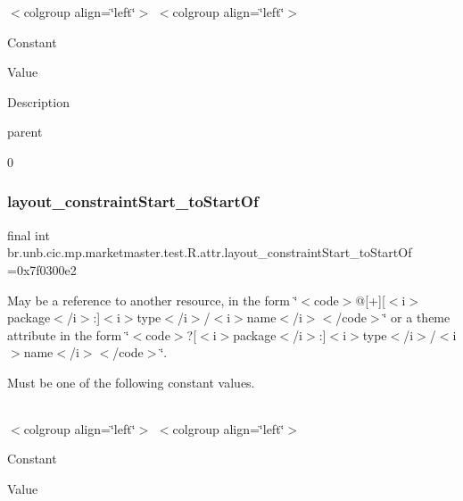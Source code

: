 \tabulinesep=1mm
\begin{longtabu} spread 0pt [c]{*{0}{|X[-1]}|}
\hline
\end{longtabu}
$<$colgroup align=\char`\"{}left\char`\"{}$>$ $<$colgroup align=\char`\"{}left\char`\"{}$>$ 

Constant

Value

Description 

parent

0\mbox{\label{classbr_1_1unb_1_1cic_1_1mp_1_1marketmaster_1_1test_1_1R_1_1attr_a4297387be435a53dc50588895bb90ec6}} 
\subsubsection{\texorpdfstring{layout\+\_\+constraint\+Start\+\_\+to\+Start\+Of}{layout\_constraintStart\_toStartOf}}
{\footnotesize\ttfamily final int br.\+unb.\+cic.\+mp.\+marketmaster.\+test.\+R.\+attr.\+layout\+\_\+constraint\+Start\+\_\+to\+Start\+Of =0x7f0300e2\hspace{0.3cm}{\ttfamily [static]}}

May be a reference to another resource, in the form \char`\"{}$<$code$>$@\mbox{[}+\mbox{]}\mbox{[}$<$i$>$package$<$/i$>$\+:\mbox{]}$<$i$>$type$<$/i$>$/$<$i$>$name$<$/i$>$$<$/code$>$\char`\"{} or a theme attribute in the form \char`\"{}$<$code$>$?\mbox{[}$<$i$>$package$<$/i$>$\+:\mbox{]}$<$i$>$type$<$/i$>$/$<$i$>$name$<$/i$>$$<$/code$>$\char`\"{}. 

Must be one of the following constant values.

\tabulinesep=1mm
\begin{longtabu} spread 0pt [c]{*{0}{|X[-1]}|}
\hline
\end{longtabu}
$<$colgroup align=\char`\"{}left\char`\"{}$>$ $<$colgroup align=\char`\"{}left\char`\"{}$>$ 

Constant

Value

